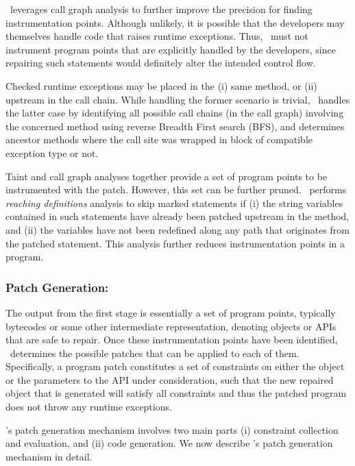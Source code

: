  \tool\ leverages call graph analysis to
further improve the precision for finding instrumentation points. Although
unlikely, it is possible that the developers may themselves handle code that
raises runtime exceptions. Thus, \tool\ must not instrument program points that
are explicitly handled by the developers, since repairing such statements
would definitely alter the intended control flow.

Checked runtime exceptions may be placed in the (i) same method, or (ii)
upstream in the call chain. While handling the former scenario is trivial,
\tool\ handles the latter case by identifying all possible call chains (in
the call graph) involving the concerned method using reverse Breadth First
search (BFS), and determines ancestor methods where the call site was wrapped in
 block of compatible exception type or not.

 Taint and call graph analyses
together provide a set of program points to be instrumented with the
patch. However, this set can be further pruned. \tool\ performs \textit{reaching
definitions} analysis to skip marked statements if
(i) the string variables contained in such statements have already been patched
upstream in the method, and (ii) the variables have not been redefined along any
path that originates from the patched statement. This analysis further reduces
instrumentation points in a program.

\subsubsection{Patch Generation: }
\label{sec:tool:stage2}
% 
The output from the first stage is essentially a set of program points,
typically bytecodes or some other intermediate representation, denoting
 objects or APIs that are safe to repair. Once these
instrumentation points have been identified, \tool\ determines the
possible patches that can be applied to each of them. Specifically, a program
patch constitutes a set of constraints on either the  object or the
parameters to the  API under consideration, such that the new
repaired  object that is generated will satisfy all constraints and
thus the patched program does not throw any runtime exceptions.

\tool's patch generation mechanism involves two main parts (i) constraint
collection and evaluation, and (ii) code generation. We now describe \tool's
patch generation mechanism in detail. 

